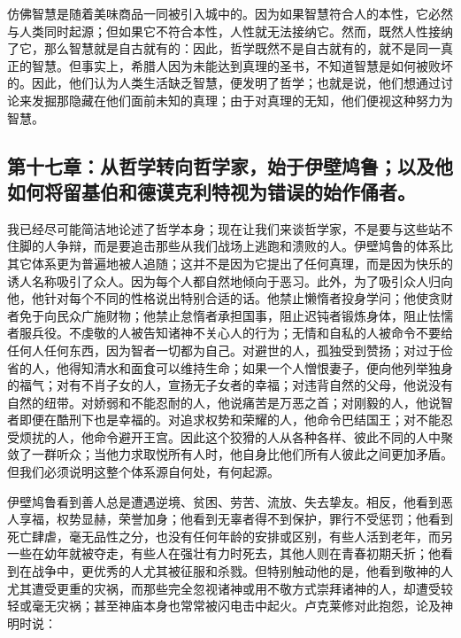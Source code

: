 \par

仿佛智慧是随着美味商品一同被引入城中的。因为如果智慧符合人的本性，它必然与人类同时起源；但如果它不符合本性，人性就无法接纳它。然而，既然人性接纳了它，那么智慧就是自古就有的：因此，哲学既然不是自古就有的，就不是同一真正的智慧。但事实上，希腊人因为未能达到真理的圣书，不知道智慧是如何被败坏的。因此，他们认为人类生活缺乏智慧，便发明了哲学；也就是说，他们想通过讨论来发掘那隐藏在他们面前未知的真理；由于对真理的无知，他们便视这种努力为智慧。\par


\subsection{第十七章：从哲学转向哲学家，始于伊壁鸠鲁；以及他如何将留基伯和德谟克利特视为错误的始作俑者。}

我已经尽可能简洁地论述了哲学本身；现在让我们来谈哲学家，不是要与这些站不住脚的人争辩，而是要追击那些从我们战场上逃跑和溃败的人。伊壁鸠鲁的体系比其它体系更为普遍地被人追随；这并不是因为它提出了任何真理，而是因为快乐的诱人名称吸引了众人。因为每个人都自然地倾向于恶习。此外，为了吸引众人归向他，他针对每个不同的性格说出特别合适的话。他禁止懒惰者投身学问；他使贪财者免于向民众广施财物；他禁止怠惰者承担国事，阻止迟钝者锻炼身体，阻止怯懦者服兵役。不虔敬的人被告知诸神不关心人的行为；无情和自私的人被命令不要给任何人任何东西，因为智者一切都为自己。对避世的人，孤独受到赞扬；对过于俭省的人，他得知清水和面食可以维持生命；如果一个人憎恨妻子，便向他列举独身的福气；对有不肖子女的人，宣扬无子女者的幸福；对违背自然的父母，他说没有自然的纽带。对娇弱和不能忍耐的人，他说痛苦是万恶之首；对刚毅的人，他说智者即便在酷刑下也是幸福的。对追求权势和荣耀的人，他命令巴结国王；对不能忍受烦扰的人，他命令避开王宫。因此这个狡猾的人从各种各样、彼此不同的人中聚敛了一群听众；当他力求取悦所有人时，他自身比他们所有人彼此之间更加矛盾。但我们必须说明这整个体系源自何处，有何起源。\par

伊壁鸠鲁看到善人总是遭遇逆境、贫困、劳苦、流放、失去挚友。相反，他看到恶人享福，权势显赫，荣誉加身；他看到无辜者得不到保护，罪行不受惩罚；他看到死亡肆虐，毫无品性之分，也没有任何年龄的安排或区别，有些人活到老年，而另一些在幼年就被夺走，有些人在强壮有力时死去，其他人则在青春初期夭折；他看到在战争中，更优秀的人尤其被征服和杀戮。但特别触动他的是，他看到敬神的人尤其遭受更重的灾祸，而那些完全忽视诸神或用不敬方式崇拜诸神的人，却遭受较轻或毫无灾祸；甚至神庙本身也常常被闪电击中起火。卢克莱修对此抱怨，论及神明时说：\par

